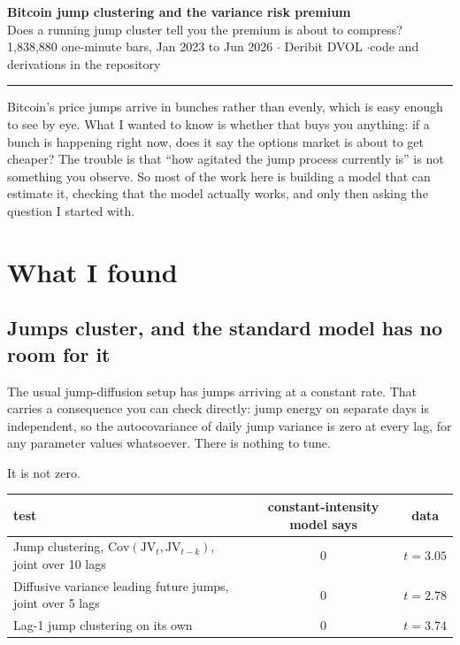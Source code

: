 \documentclass[11pt]{article}
\newcommand{\JV}{\mathrm{JV}}
\begin{document}
\thispagestyle{empty}

{\LARGE\bfseries Bitcoin jump clustering and the variance risk premium}\\[4pt]
{\large\color{muted} Does a running jump cluster tell you the premium is about to compress?}\\[8pt]
{\color{muted}\small 1{,}838{,}880 one-minute bars, Jan 2023 to Jun 2026 \quad$\cdot$\quad
Deribit DVOL \quad$\cdot$\quad code and derivations in the repository}

\vspace{6pt}\hrule\vspace{8pt}

Bitcoin's price jumps arrive in bunches rather than evenly, which is easy enough
to see by eye. What I wanted to know is whether that buys you anything: if a
bunch is happening right now, does it say the options market is about to get
cheaper? The trouble is that ``how agitated the jump process currently is'' is
not something you observe. So most of the work here is building a model that can
estimate it, checking that the model actually works, and only then asking the
question I started with.

\section{What I found}

\subsection*{Jumps cluster, and the standard model has no room for it}

The usual jump-diffusion setup has jumps arriving at a constant rate. That
carries a consequence you can check directly: jump energy on separate days is
independent, so the autocovariance of daily jump variance is zero at every lag,
for any parameter values whatsoever. There is nothing to tune.

It is not zero.

\begin{center}\small
\begin{tabular}{lcc}
\toprule
test & constant-intensity model says & data\\
\midrule
Jump clustering, $\mathrm{Cov}(\JV_t,\JV_{t-k})$, joint over 10 lags & $0$ & $t = 3.05$\\
Diffusive variance leading future jumps, joint over 5 lags & $0$ & $t = 2.78$\\
Lag-1 jump clustering on its own & $0$ & $t = 3.74$\\
\bottomrule
\end{tabular}
\end{center}
\end{document}
